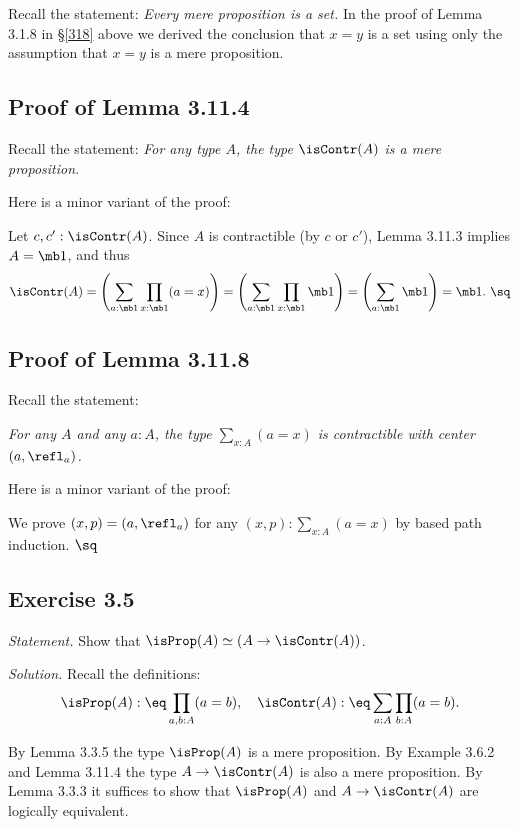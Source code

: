 \documentclass[12pt]{article}
\begin{document}
Recall the statement: \emph{Every mere proposition is a set.} In the proof of Lemma 3.1.8 in \S\ref{318} above we derived the conclusion that $x=y$ is a set using only the assumption that $x=y$ is a mere proposition.


\subsection{Proof of Lemma 3.11.4} 

Recall the statement: \emph{For any type $A$, the type $\isContr(A)$ is a mere proposition.}

Here is a minor variant of the proof:

Let $c,c':\isContr(A)$. Since $A$ is contractible (by $c$ or $c'$), Lemma 3.11.3 implies $A=\mb1$, and thus 
$$
\isContr(A)=\left(\sum_{a:\mb1}\prod_{x:\mb1}(a=x)\right)=\left(\sum_{a:\mb1}\prod_{x:\mb1}\mb1\right)=\left(\sum_{a:\mb1}\mb1\right)=\mb1.\ \sq
$$


\subsection{Proof of Lemma 3.11.8} 

Recall the statement: 

\nn\emph{For any $A$ and any $a:A$, the type $\sum_{x:A}(a=x)$ is contractible with center $(a,\refl_a)$.}

Here is a minor variant of the proof:

We prove $(x,p)=(a,\refl_a)$ for any $(x,p):\sum_{x:A}(a=x)$ by based path induction. $\sq$


\subsection{Exercise 3.5}

\emph{Statement.} Show that $\isProp(A)\simeq(A\to\isContr(A))$. 

\nn\emph{Solution.} Recall the definitions: 
$$
\isProp(A):\eq\prod_{a,b:A}(a=b),\quad\isContr(A):\eq\sum_{a:A}\prod_{b:A}(a=b).
$$

By Lemma 3.3.5 the type $\isProp(A)$ is a mere proposition. By Example 3.6.2 and Lemma 3.11.4 the type $A\to\isContr(A)$ is also a mere proposition. By Lemma 3.3.3 it suffices to show that $\isProp(A)$ and $A\to\isContr(A)$ are logically equivalent. 
\end{document}
